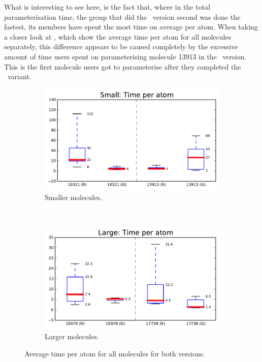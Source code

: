 What is interesting to see here, is the fact that, where in the total parameterisation time, the group that did the \IDb\ version second was done the fastest, its members have spent the most time on average per atom. When taking a closer look at , which show the average time per atom for all molecules separately, this difference appears to be caused completely by the excessive amount of time users spent on parameterising molecule 13913 in the \IDb\ version. This is the first molecule users got to parameterise after they completed the \IDa\ variant.

\begin{figure}[h!]
\centering
\begin{subfigure}[t]{0.48\textwidth}
\centering
\includegraphics[width=\textwidth]{img/graphs/1c_03.pdf}
\caption{Smaller molecules.}
\end{subfigure}%
~
\begin{subfigure}[t]{0.48\textwidth}
\centering
\includegraphics[width=\textwidth]{img/graphs/1d_03.pdf}
\caption{Larger molecules.}
\end{subfigure}
\caption{Average time per atom for all molecules for both versions.}
\end{figure}

